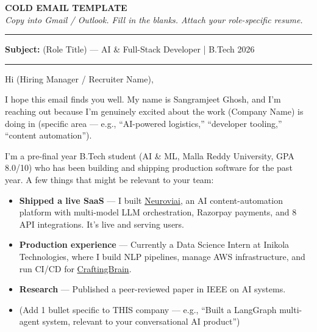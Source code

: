 \documentclass[11pt]{article}
\newcommand{\blank}[1]{\underline{\hspace{#1}}}
\begin{document}

\begin{center}
{\large \textbf{COLD EMAIL TEMPLATE}} \\[4pt]
{\small \textit{Copy into Gmail / Outlook. Fill in the blanks. Attach your role-specific resume.}}
\end{center}

\noindent\rule{\textwidth}{0.6pt}

\vspace{6pt}

\textbf{Subject:} \blank{3cm} (Role Title) — AI \& Full-Stack Developer | B.Tech 2026

\vspace{4pt}
\noindent\rule{\textwidth}{0.2pt}
\vspace{4pt}

Hi \blank{3cm} (Hiring Manager / Recruiter Name),

I hope this email finds you well. My name is Sangramjeet Ghosh, and I'm reaching out because I'm genuinely excited about the work \blank{4cm} (Company Name) is doing in \blank{4cm} (specific area — e.g., ``AI-powered logistics,'' ``developer tooling,'' ``content automation'').

I'm a pre-final year B.Tech student (AI \& ML, Malla Reddy University, GPA 8.0/10) who has been building and shipping production software for the past year. A few things that might be relevant to your team:

\begin{itemize}
\setlength{\itemsep}{4pt}
\item \textbf{Shipped a live SaaS} — I built \href{https://neuroviai.com}{Neuroviai}, an AI content-automation platform with multi-model LLM orchestration, Razorpay payments, and 8 API integrations. It's live and serving users.
\item \textbf{Production experience} — Currently a Data Science Intern at Inikola Technologies, where I build NLP pipelines, manage AWS infrastructure, and run CI/CD for \href{https://craftingbrain.com}{CraftingBrain}.
\item \textbf{Research} — Published a peer-reviewed paper in IEEE on AI systems.
\item \textbf{\blank{4cm}} (Add 1 bullet specific to THIS company — e.g., ``Built a LangGraph multi-agent system, relevant to your conversational AI product'')
\end{itemize}
\end{document}

